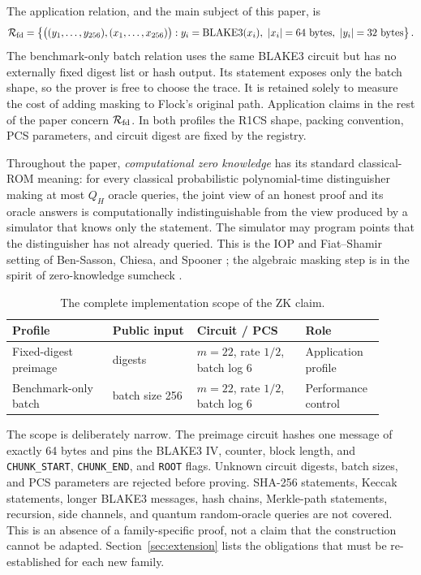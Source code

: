 \documentclass[11pt]{article}
\theoremstyle{definition}
\begin{document}
The application relation, and the main subject of this paper, is
\[
  \mathcal{R}_{\rm fd}
  =\left\{
    \bigl((y_1,\ldots,y_{256}),(x_1,\ldots,x_{256})\bigr):
    y_i=\operatorname{BLAKE3}(x_i),\ |x_i|=64\text{ bytes},
    \ |y_i|=32\text{ bytes}
  \right\}.
\]
The benchmark-only batch relation uses the same BLAKE3 circuit but has no
externally fixed digest list or hash output.  Its statement exposes only the
batch shape, so the prover is free to choose the trace.  It is retained solely
to measure the cost of adding masking to Flock's original path.  Application
claims in the rest of the paper concern $\mathcal{R}_{\rm fd}$.  In both
profiles the R1CS shape, packing convention, PCS parameters, and circuit digest
are fixed by the registry.

Throughout the paper, \emph{computational zero knowledge} has its standard
classical-ROM meaning: for every classical probabilistic polynomial-time
distinguisher making at most $Q_H$ oracle queries, the joint view of an honest
proof and its oracle answers is computationally indistinguishable from the
view produced by a simulator that knows only the statement.  The simulator may
program points that the distinguisher has not already queried.  This is the IOP
and Fiat--Shamir setting of Ben-Sasson, Chiesa, and Spooner
\cite{BCS}; the algebraic masking step is in the spirit of zero-knowledge
sumcheck \cite{CFS17}.

\begin{table}[ht]
\centering\small
\caption{The complete implementation scope of the ZK claim.}
\label{tab:profiles}
\begin{tabular}{@{}>{\raggedright\arraybackslash}p{0.25\linewidth}
                  >{\raggedright\arraybackslash}p{0.21\linewidth}
                  >{\raggedright\arraybackslash}p{0.27\linewidth}
                  >{\raggedright\arraybackslash}p{0.18\linewidth}@{}}
\toprule
Profile & Public input & Circuit / PCS & Role \\
\midrule
Fixed-digest preimage & 256 digests
  & $m=22$, rate $1/2$, batch log 6 & Application profile \\
Benchmark-only batch & batch size 256
  & $m=22$, rate $1/2$, batch log 6 & Performance control \\
\bottomrule
\end{tabular}
\end{table}

The scope is deliberately narrow.  The preimage circuit hashes one message of
exactly 64 bytes and pins the BLAKE3 IV, counter, block length, and
\texttt{CHUNK\_START}, \texttt{CHUNK\_END}, and \texttt{ROOT} flags.  Unknown
circuit digests, batch sizes, and PCS parameters are rejected before proving.
SHA-256 statements, Keccak statements, longer BLAKE3 messages, hash chains,
Merkle-path statements, recursion, side channels, and quantum random-oracle
queries are not covered.  This is an absence of a family-specific proof, not a
claim that the construction cannot be adapted.  Section~\ref{sec:extension}
lists the obligations that must be re-established for each new family.
\end{document}
